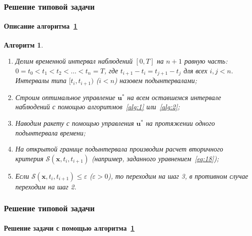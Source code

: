 \documentclass[ignorenonframetext,hyperref={pdftex,unicode,pdfpagelabels=false},compress]{beamer}
\newtheorem{alg}{Алгоритм}
\begin{document}
\begin{frame}
	\frametitle{Решение типовой задачи}
	\framesubtitle{Описание алгоритма~\ref{alg:3}}\small
    
    \begin{alg}\label{alg:3}~
        \begin{enumerate}
            \item
                Делим временной интервал наблюдений $[0, T]$ на $n+1$ равную часть: $0 = t_0 < t_1 < t_2 < \ldots < t_{n} = T$, где $t_{i+1}-t_i = t_{j+1}-t_j$ для всех $i, j < n$. Интервалы типа $[t_i, t_{i+1})$ ($i<n$) назовем \emph{подынтервалами};

            \item
                Строим оптимальное управление $\mathbf{u}^*$ на всем оставшемся интервале наблюдений с помощью алгоритмов~\ref{alg:1} или~\ref{alg:2};

            \item
                Наводим ракету с помощью управления $\mathbf{u}^*$ на протяжении одного подынтервала времени;

            \item
                На открытой границе подынтервала производим расчет вторичного критерия $\mathscr{S}(\mathbf{x}, t_i, t_{i+1})$ (например, заданного уравнением~\ref{eq:18});

            \item
                Если $\mathscr{S}(\mathbf{x}, t_i, t_{i+1}) \leqslant \varepsilon$ ($\varepsilon > 0$), то переходим на шаг 3, в противном случае переходим на шаг 2.
        \end{enumerate}
    \end{alg}
\end{frame}



\begin{frame}
	\frametitle{Решение типовой задачи}
	\framesubtitle{Решение задачи с помощью алгоритма~\ref{alg:3}}
    
    \begin{figure}\center
        
        \label{fig:alg3}
    \end{figure}
\end{frame}
\end{document}
